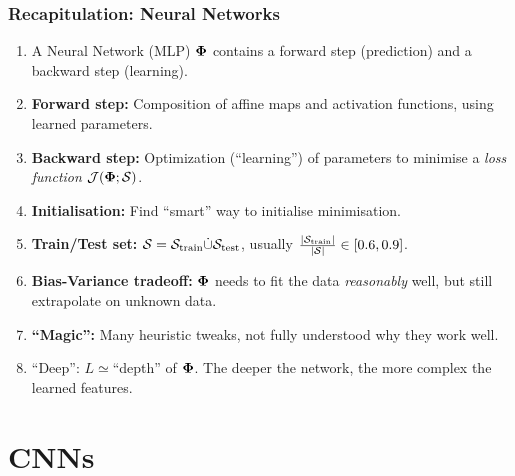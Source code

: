 \documentclass[10pt,hyperref={pdfpagelabels=false}]{beamer}
\begin{document}
\begin{frame}
    \frametitle{Recapitulation: Neural Networks}
    \begin{enumerate}
        \item A Neural Network (MLP) $\boldsymbol{\Phi}$ contains a forward step (prediction) and a backward step (learning).
        \item {\bf Forward step:} Composition of affine maps and activation functions, using learned parameters.
        \item {\bf Backward step:} Optimization (``learning'') of parameters to minimise a \emph{loss function} $\mathcal{J}(\boldsymbol{\Phi}; \mathcal{S})$.
        \item {\bf Initialisation:} Find ``smart'' way to initialise minimisation.
        \item {\bf Train/Test set:} $\mathcal{S}=\mathcal{S}_{\text{train}}\dot{\cup} \mathcal{S}_{\text{test}}$, usually $\frac{\left|\dataset_{\text{train}}\right|}{\left|\dataset\right|} \in [0.6, 0.9]$.
        \item {\bf Bias-Variance tradeoff:} $\boldsymbol{\Phi}$ needs to fit the data \emph{reasonably} well, but still extrapolate on unknown data.
        \item {\bf ``Magic'':} Many heuristic tweaks, not fully understood why they work well.
        \item ``Deep'': $L\simeq$``depth'' of $\boldsymbol{\Phi}$. The deeper the network, the more complex the learned features.
    \end{enumerate}
\end{frame}
\section{CNNs}
\end{document}
